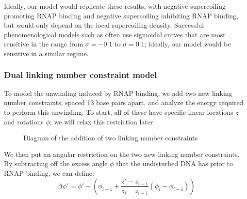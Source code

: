 \documentclass[11pt]{article} %
\begin{document}
Ideally, our model would replicate these results, with negative supercoiling promoting RNAP binding and negative supercoiling inhibiting RNAP binding, but would only depend on the local supercoiling density. Successful phenomenological models such as \textcite{elhoudaiguiBacterialGenomeArchitecture2019a} often use sigmoidal curves that are most sensitive in the range from \(\sigma = -0.1\) to \(\sigma = 0.1\); ideally, our model would be sensitive in a similar regime.

\FloatBarrier
\subsubsection{Dual linking number constraint model}
To model the unwinding induced by RNAP binding, we add two new linking number constraints, spaced 13 base pairs apart, and analyze the energy required to perform this unwinding. To start, all of these have specific linear locations \(z\) and rotations \(\phi\); we will relax this restriction later.

\begin{figure}[h]
    \centering
    \caption{Diagram of the addition of two linking number constraints}
    \label{fig:lnc_diagram}
\end{figure}

We then put an angular restriction on the two new linking number constraints. By subtracting off the excess angle \(\phi\) that the undisturbed DNA has prior to RNAP binding, we can define:
\begin{equation}
    \Delta \phi' = \phi' - \left(\phi_{i - 1} + \frac{z' - z_{i-1}}{z_i - z_{i-1}} (\phi_i - \phi_{i-1})\right)
\end{equation}
\end{document}

